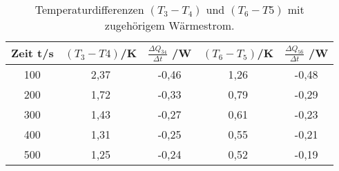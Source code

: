 \begin{table}[H]
  \centering
   \begin{tabular}{c c c c c}
    \toprule
     Zeit t/\;s & $(T_{3}-T{4})$/\;K & $\frac{\Delta Q_{34}}{\Delta t}$ /\;W &
     $(T_{6}-T_{5})$/\;K & $\frac{\Delta Q_{56}}{\Delta t}$ /\;W \\
    \midrule
    100 & 2,37 & -0,46 & 1,26 & -0,48 \\
    200 & 1,72 & -0,33  & 0,79 & -0,29 \\
    300 & 1,43 & -0,27 & 0,61 & -0,23 \\
    400 & 1,31 & -0,25  & 0,55 & -0,21\\
    500 & 1,25 & -0,24  &  0,52 & -0,19\\

    \bottomrule
  \end{tabular}
  \caption{Temperaturdifferenzen $(T_{3}-T_{4})$ und $(T_{6}-T{5})$ mit zugehörigem
  Wärmestrom.}
  \label{tab:tab1}
\end{table}
